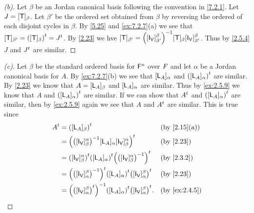 \begin{proof}[(b)]
  Let \(\beta\) be an Jordan canonical basis following the convention in \cref{7.2.1}.
  Let \(J = [\mathsf{T}]_{\beta}\).
  Let \(\beta'\) be the ordered set obtained from \(\beta\) by reversing the ordered of each disjoint cycles in \(\beta\).
  By \cref{5.25} and \cref{ex:7.2.7}(a) we see that \([\mathsf{T}]_{\beta'} = {([\mathsf{T}]_{\beta})}^{t} = {J}^{t}\).
  By \cref{2.23} we hve \([\T]_{\beta'} = \pa{[\IT[\V]]_{\beta'}^{\beta}}^{-1} [\T]_{\beta} [\IT[\V]]_{\beta'}^{\beta}\).
  Thus by \cref{2.5.4} \(J\) and \({J}^{t}\) are similar.
\end{proof}

\begin{proof}[(c)]
  Let \(\beta\) be the standard ordered basis for \(\mathsf{F}^n\) over \(\mathit{F}\) and let \(\alpha\) be a Jordan canonical basis for \(A\).
  By \cref{ex:7.2.7}(b) we see that \([\mathsf{L}_A]_{\alpha}\) and \({([\mathsf{L}_A]_{\alpha})}^{t}\) are similar.
  By \cref{2.23} we know that \(A = [\mathsf{L}_A]_{\beta}\) and \([\mathsf{L}_A]_{\alpha}\) are similar.
  Thus by \cref{ex:2.5.9} we know that \(A\) and \({([\mathsf{L}_A]_{\alpha})}^{t}\) are similar.
  If we can show that \({A}^{t}\) and \({([\mathsf{L}_A]_{\alpha})}^{t}\) are similar, then by \cref{ex:2.5.9} again we see that \(A\) and \({A}^{t}\) are similar.
  This is true since
  \begin{align*}
    \tp{A} & = \tp{([\L_A]_{\beta})}                                                                                       &  & \by{2.15}[a]  \\
           & = \tp{\pa{\pa{[\IT[\V]]_{\beta}^{\alpha}}^{-1} [\L_A]_{\alpha} [\IT[\V]]_{\beta}^{\alpha}}}                   &  & \by{2.23}     \\
           & = \tp{([\IT[\V]]_{\beta}^{\alpha})} \tp{([\L_A]_{\alpha})} \tp{\pa{\pa{[\IT[\V]]_{\beta}^{\alpha}}^{-1}}}     &  & \by{2.3.2}    \\
           & = \tp{\pa{\pa{[\IT[\V]]_{\alpha}^{\beta}}^{-1}}} \tp{([\L_A]_{\alpha})} \tp{\pa{[\IT[\V]]_{\alpha}^{\beta}}}  &  & \by{2.23}     \\
           & = \pa{\tp{\pa{[\IT[\V]]_{\alpha}^{\beta}}}}^{-1} \tp{([\L_A]_{\alpha})} \tp{\pa{[\IT[\V]]_{\alpha}^{\beta}}}. &  & \by{ex:2.4.5}
  \end{align*}
\end{proof}

\begin{ex}\label{ex:7.2.8}

\end{ex}

\begin{ex}\label{ex:7.2.9}

\end{ex}

\begin{ex}\label{ex:7.2.20}
\end{ex}

\begin{ex}\label{ex:7.2.21}
\end{ex}
